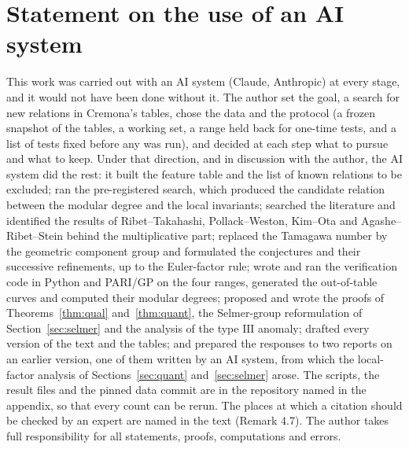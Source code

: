 \documentclass[11pt]{amsart}
\theoremstyle{definition}
\begin{document}
\section*{Statement on the use of an AI system}
This work was carried out with an AI system (Claude, Anthropic) at every stage, and it would not have been done without it. The author set the goal, a search for new relations in Cremona's tables, chose the data and the protocol (a frozen snapshot of the tables, a working set, a range held back for one-time tests, and a list of tests fixed before any was run), and decided at each step what to pursue and what to keep. Under that direction, and in discussion with the author, the AI system did the rest: it built the feature table and the list of known relations to be excluded; ran the pre-registered search, which produced the candidate relation between the modular degree and the local invariants; searched the literature and identified the results of Ribet--Takahashi, Pollack--Weston, Kim--Ota and Agashe--Ribet--Stein behind the multiplicative part; replaced the Tamagawa number by the geometric component group and formulated the conjectures and their successive refinements, up to the Euler-factor rule; wrote and ran the verification code in Python and PARI/GP on the four ranges, generated the out-of-table curves and computed their modular degrees; proposed and wrote the proofs of Theorems~\ref{thm:qual} and~\ref{thm:quant}, the Selmer-group reformulation of Section~\ref{sec:selmer} and the analysis of the type $\mathrm{III}$ anomaly; drafted every version of the text and the tables; and prepared the responses to two reports on an earlier version, one of them written by an AI system, from which the local-factor analysis of Sections~\ref{sec:quant} and~\ref{sec:selmer} arose. The scripts, the result files and the pinned data commit are in the repository named in the appendix, so that every count can be rerun. The places at which a citation should be checked by an expert are named in the text (Remark 4.7). The author takes full responsibility for all statements, proofs, computations and errors.



\end{document}
